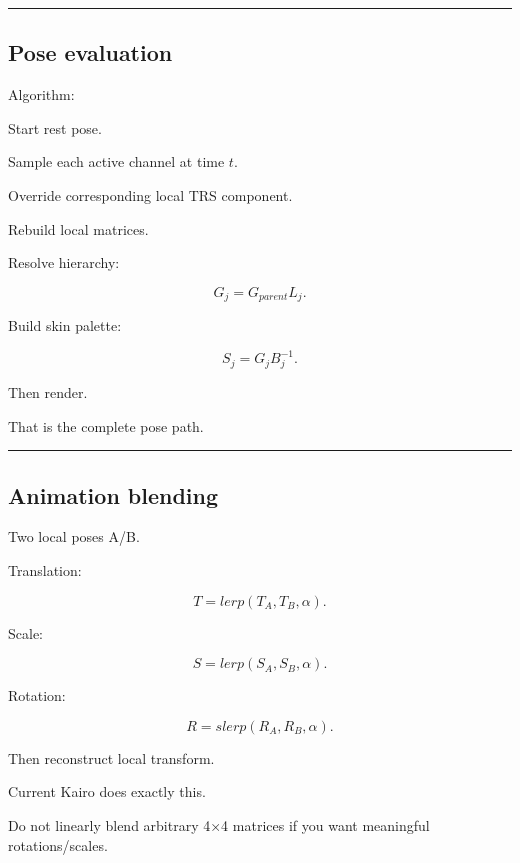 \begin{center}\rule{0.5\linewidth}{0.5pt}\end{center}

\subsection{Pose evaluation}\label{04-visual-computing-ii-ch041-pose-evaluation}

\hypertarget{04-visual-computing-ii-ch041-pose-evaluation}{}

Algorithm:

Start rest pose.

Sample each active channel at time \(t\).

Override corresponding local TRS component.

Rebuild local matrices.

Resolve hierarchy:

\[
G_j=
G_{parent}L_j.
\]

Build skin palette:

\[
S_j=
G_jB_j^{-1}.
\]

Then render.

That is the complete pose path.

\begin{center}\rule{0.5\linewidth}{0.5pt}\end{center}

\subsection{Animation blending}\label{04-visual-computing-ii-ch041-animation-blending}

\hypertarget{04-visual-computing-ii-ch041-animation-blending}{}

Two local poses A/B.

Translation:

\[
T=
lerp(T_A,T_B,\alpha).
\]

Scale:

\[
S=
lerp(S_A,S_B,\alpha).
\]

Rotation:

\[
R=
slerp(R_A,R_B,\alpha).
\]

Then reconstruct local transform.

Current Kairo  does exactly this.

Do not linearly blend arbitrary 4×4 matrices if you want meaningful rotations/scales.

